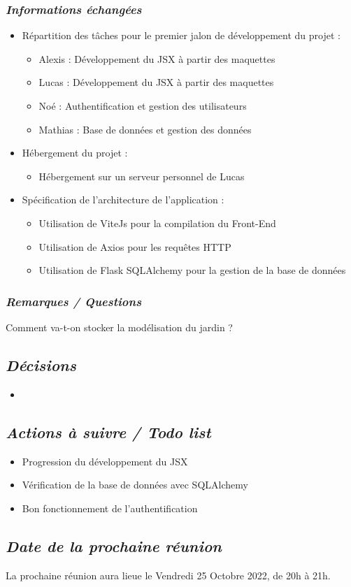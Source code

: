 \documentclass[french,a4paper]{article}
\begin{document}
\subsubsection*{\textit{Informations échangées}}
\begin{itemize}
  \item Répartition des tâches pour le premier jalon de développement du projet :
    \begin{itemize}
      \item Alexis : Développement du JSX à partir des maquettes
      \item Lucas : Développement du JSX à partir des maquettes
      \item Noé : Authentification et gestion des utilisateurs
      \item Mathias : Base de données et gestion des données 
    \end{itemize}
  \item Hébergement du projet :
    \begin{itemize}
      \item Hébergement sur un serveur personnel de Lucas
    \end{itemize}
  \item  Spécification de l'architecture de l'application :
    \begin{itemize}
      \item Utilisation de ViteJs pour la compilation du Front-End
      \item Utilisation de Axios pour les requêtes HTTP
      \item Utilisation de Flask SQLAlchemy pour la gestion de la base de données 
    \end{itemize}
\end{itemize}
\subsubsection*{\textit{Remarques / Questions}}
Comment va-t-on stocker la modélisation du jardin ?

\subsection*{\textit{Décisions}}
\begin{itemize}
  \item 
\end{itemize}

\subsection*{\textit{Actions à suivre / Todo list}}
\begin{itemize}
  \item Progression du développement du JSX
  \item Vérification de la base de données avec SQLAlchemy
  \item Bon fonctionnement de l'authentification
\end{itemize}

\subsection*{\textit{Date de la prochaine réunion}}
La prochaine réunion aura lieue le Vendredi 25 Octobre 2022, de 20h à 21h.
\end{document}
